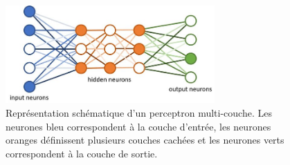 \begin{figure}
  \centering
  \includegraphics[width=8cm]{./Chapitre2/figures/perceptronMLP.png}
  \caption{Représentation schématique d'un perceptron multi-couche. Les neurones bleu correspondent à la couche d'entrée, les neurones oranges définissent plusieurs couches cachées et les neurones verts correspondent à la couche de sortie.}
  \label{fig:perceptronMLP}
\end{figure}

